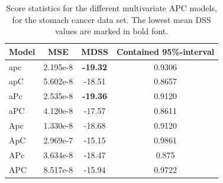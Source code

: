 \begin{table}
    \begin{center}
    \begin{tabular}{l |c c c }
        Model & MSE & MDSS & Contained 95\%-interval\\
        \hline
        apc    &2.195e-8 &\textbf{-19.32}    &0.9306 \\
        apC    &5.602e-8 &-18.51    &0.8657 \\
        aPc    &2.535e-8 &\textbf{-19.36}    &0.9120 \\
        aPC    &4.120e-8 &-17.57    &0.8611 \\
        Apc    &1.330e-8 &-18.68    &0.9120 \\
        ApC    &2.969e-7  &-15.15    &0.9861 \\
        APc    &3.634e-8 &-18.47    &0.875  \\
        APC    &8.517e-8 &-15.94    &0.9722 \\
    \end{tabular}
    \caption{Score statistics for the different multivariate APC models, for the stomach cancer data set. The lowest mean DSS values are marked in bold font. }\label{tbl:mv-APC-stomach}
    \end{center}
\end{table}




